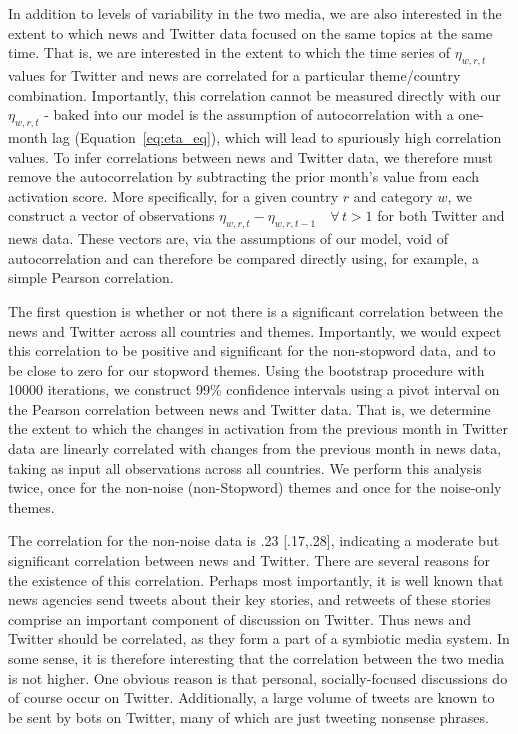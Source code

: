 In addition to levels of variability in the two media, we are also interested in the extent to which news and Twitter data focused on the same topics at the same time.  That is, we are interested in the extent to which the time series of $\eta_{w,r,t}$ values for Twitter and news are correlated for a particular theme/country combination.  Importantly, this correlation cannot be measured directly with our $\eta_{w,r,t}$ - baked into our model is the assumption of autocorrelation with a one-month lag (Equation~\ref{eq:eta_eq}), which will lead to spuriously high correlation values.  To infer correlations between news and Twitter data, we therefore must remove the autocorrelation by subtracting the prior month's value from each activation score.  More specifically, for a given country $r$ and category $w$, we construct a vector of observations $\eta_{w,r,t}-\eta_{w,r,t-1} \quad \forall \, t > 1$ for both Twitter and news data. These vectors are, via the assumptions of our model, void of autocorrelation and can therefore be compared directly using, for example, a simple Pearson correlation.

The first question is whether or not there is a significant correlation between the news and Twitter across all countries and themes. Importantly, we would expect this correlation to be positive and significant for the non-stopword data, and to be close to zero for our stopword themes. Using the bootstrap procedure  with 10000 iterations, we construct 99\% confidence intervals using a pivot interval \citep{wasserman_all_2003} on the Pearson correlation between news and Twitter data. That is, we determine the extent to which the changes in activation from the previous month in Twitter data are linearly correlated with changes from the previous month in news data, taking as input all observations across all countries.  We perform this analysis twice, once for the non-noise (non-Stopword) themes and once for the noise-only themes.


The correlation for the non-noise data is .23 [.17,.28], indicating a moderate but significant correlation between news and Twitter.  There are several reasons for the existence of this correlation. Perhaps most importantly, it is well known that news agencies send tweets about their key stories, and retweets of these stories comprise an important component of discussion on Twitter. Thus news and Twitter should be correlated, as they form a part of a symbiotic media system.  In some sense, it is therefore interesting that the correlation between the two media is not higher.  One obvious reason is that personal, socially-focused discussions do of course occur on Twitter. Additionally, a large volume of tweets are known to be sent by bots on Twitter, many of which are just tweeting nonsense phrases.

